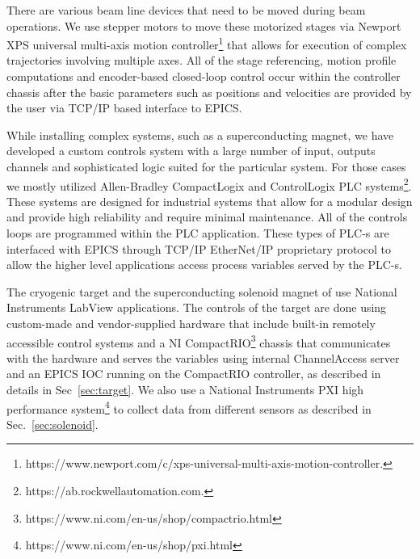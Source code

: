 There are various beam line devices that need to be moved during beam operations. We use stepper motors to move these motorized stages via Newport XPS universal multi-axis motion controller\footnote{https://www.newport.com/c/xps-universal-multi-axis-motion-controller.} that allows for execution of complex trajectories involving multiple axes. All of the stage referencing, motion profile computations and encoder-based closed-loop control occur within the controller chassis after the basic parameters such as positions and velocities are provided by the user via TCP/IP based interface to EPICS.   

While installing complex systems, such as a superconducting magnet, we have developed a custom controls system with a large number of input, outputs channels and sophisticated logic suited for the particular system. For those cases we mostly  utilized Allen-Bradley CompactLogix and ControlLogix PLC systems\footnote{https://ab.rockwellautomation.com.}. These systems are designed for industrial systems that allow for a modular design and provide high reliability and require minimal maintenance. All of the controls loops are programmed within the PLC application. These types of PLC-s are interfaced with EPICS through TCP/IP EtherNet/IP proprietary protocol to allow the higher level applications access process variables served by the PLC-s.  

The cryogenic target and the superconducting solenoid magnet of \gx{} use National Instruments LabView applications. The controls of the target are done using custom-made and vendor-supplied hardware that include built-in remotely accessible control systems and a NI CompactRIO\footnote{https://www.ni.com/en-us/shop/compactrio.html} chassis that communicates with the hardware and serves the variables using internal ChannelAccess server and an EPICS IOC running on the CompactRIO controller, as described in details in Sec~\ref{sec:target}. We also use a National Instruments PXI high performance system\footnote{https://www.ni.com/en-us/shop/pxi.html} to collect data from different sensors as described in Sec.~\ref{sec:solenoid}. 

